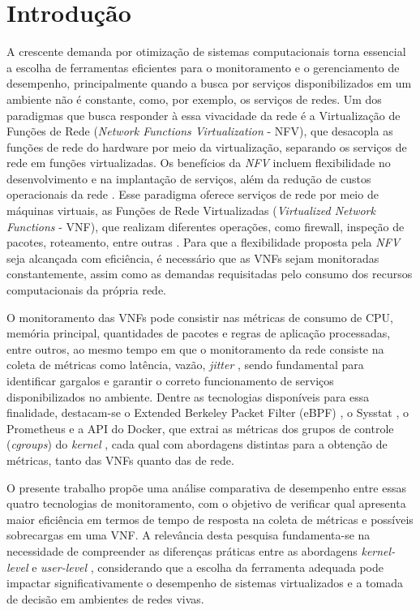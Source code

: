 \chapter{Introdução}

A crescente demanda por otimização de sistemas computacionais torna essencial a escolha de ferramentas eficientes para o monitoramento e o gerenciamento de desempenho, principalmente quando a busca por serviços disponibilizados em um ambiente não é constante, como, por exemplo, os serviços de redes. Um dos paradigmas que busca responder à essa vivacidade da rede \cite{oliveira2026-sbrc} é a Virtualização de Funções de Rede (\textit{Network Functions Virtualization} - NFV), que desacopla as funções de rede do hardware por meio da virtualização, separando os serviços de rede em funções virtualizadas. Os benefícios da \textit{NFV} incluem flexibilidade no desenvolvimento e na implantação de serviços, além da redução de custos operacionais da rede \cite{mijumbi2016}. Esse paradigma oferece serviços de rede por meio de máquinas virtuais, as Funções de Rede Virtualizadas (\textit{Virtualized Network Functions} - VNF), que realizam diferentes operações, como firewall, inspeção de pacotes, roteamento, entre outras \cite{10.1145/3172866}. Para que a flexibilidade proposta pela \textit{NFV} seja alcançada com eficiência, é necessário que as VNFs sejam monitoradas constantemente, assim como as demandas requisitadas pelo consumo dos recursos computacionais da própria rede.

O monitoramento das VNFs pode consistir nas métricas de consumo de CPU, memória principal, quantidades de pacotes e regras de aplicação processadas, entre outros, ao mesmo tempo em que o monitoramento da rede consiste na coleta de métricas como latência, vazão, \textit{jitter} \cite{rfc6390}, sendo fundamental para identificar gargalos e garantir o correto funcionamento de serviços disponibilizados no ambiente. Dentre as tecnologias disponíveis para essa finalidade, destacam-se o Extended Berkeley Packet Filter (eBPF) \cite{gregg_bpf_2019}, o Sysstat \cite{godard2024sysstat}, o Prometheus \cite{turnbull_prometheus_2018} e a API do Docker, que extrai as métricas dos grupos de controle (\textit{cgroups}) do \textit{kernel} \cite{docker_runmetrics, kernel_cgroup_v2}, cada qual com abordagens distintas para a obtenção de métricas, tanto das VNFs quanto das de rede.

O presente trabalho propõe uma análise comparativa de desempenho entre essas quatro tecnologias de monitoramento, com o objetivo de verificar qual apresenta maior eficiência em termos de tempo de resposta na coleta de métricas e possíveis sobrecargas em uma VNF. A relevância desta pesquisa fundamenta-se na necessidade de compreender as diferenças práticas entre as abordagens \textit{kernel-level} e \textit{user-level} \cite{linux_bpf_docs}, considerando que a escolha da ferramenta adequada pode impactar significativamente o desempenho de sistemas virtualizados \cite{10.1145/3397022} e a tomada de decisão em ambientes de redes vivas.

